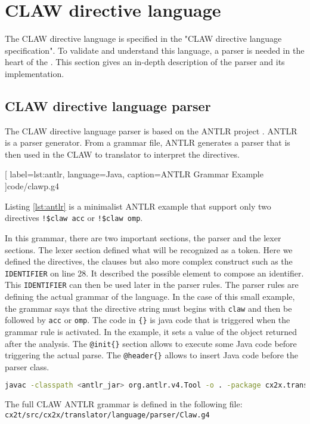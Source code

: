 \chapter{CLAW directive language}
The CLAW directive language is specified in the "CLAW directive language
specification"\cite{claw:specification}. To validate and understand this
language, a parser is needed in the heart of the \clawfcomp. This section
gives an in-depth description of the parser and its implementation.

\section{CLAW directive language parser}
The CLAW directive language parser is based on the ANTLR project
\cite{Parr:2013:DAR:2501720}. ANTLR is a parser generator. From a grammar file,
ANTLR generates a parser that is then used in the CLAW \xcodeml to \xcodeml
translator to interpret the directives.


  [
    label=lst:antlr,
    language=Java,
    caption=ANTLR Grammar Example
  ]{code/clawp.g4}

Listing \ref{lst:antlr} is a minimalist ANTLR example that support only two
directives \lstinline|!$claw acc| or \lstinline|!$claw omp|.

In this grammar, there are two important sections, the parser and the lexer
sections. The lexer section defined what will be recognized as a token. Here
we defined the directives, the clauses but also more complex construct such as
the \lstinline|IDENTIFIER| on line 28. It described the possible element to
compose an identifier. This \lstinline|IDENTIFIER| can then be used later in
the parser rules.
The parser rules are defining the actual grammar of the language. In the case
of this small example, the grammar says that the directive string must begins
with \lstinline|claw| and then be followed by \lstinline|acc| or
\lstinline|omp|. The code in \lstinline|{}| is java code that is triggered
when the grammar rule is activated. In the example, it sets a value of the
object returned after the analysis.
The \lstinline|@init{}| section allows to execute some Java code before
triggering the actual parse. The \lstinline|@header{}| allows to insert Java
code before the parser class.

\begin{lstlisting}[label=lst:antlr_cmd, caption=ANTLR parser generation command, language=bash]
javac -classpath <antlr_jar> org.antlr.v4.Tool -o . -package cx2x.translator.language.parser Claw.g4
\end{lstlisting}

The full CLAW ANTLR grammar is defined in the following file:
\lstinline|cx2t/src/cx2x/translator/language/parser/Claw.g4|
